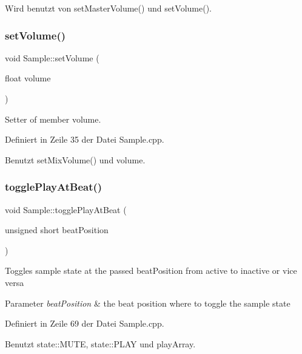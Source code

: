Wird benutzt von set\+Master\+Volume() und set\+Volume().

\mbox{\label{class_sample_ae298bfb5c8c1c3c867fa962e799a2fa5}} 
\subsubsection{\texorpdfstring{set\+Volume()}{setVolume()}}
{\footnotesize\ttfamily void Sample\+::set\+Volume (\begin{DoxyParamCaption}\item[{float}]{volume }\end{DoxyParamCaption})}



Setter of member volume. 



Definiert in Zeile 35 der Datei Sample.\+cpp.



Benutzt set\+Mix\+Volume() und volume.

\mbox{\label{class_sample_a4bf009853c35f7a29955fa2554d8e799}} 
\subsubsection{\texorpdfstring{toggle\+Play\+At\+Beat()}{togglePlayAtBeat()}}
{\footnotesize\ttfamily void Sample\+::toggle\+Play\+At\+Beat (\begin{DoxyParamCaption}\item[{unsigned short}]{beat\+Position }\end{DoxyParamCaption})}

Toggles sample state at the passed beat\+Position from active to inactive or vice versa 
\begin{DoxyParams}{Parameter}
{\em beat\+Position} & the beat position where to toggle the sample state \\
\hline
\end{DoxyParams}


Definiert in Zeile 69 der Datei Sample.\+cpp.



Benutzt state\+::\+M\+U\+TE, state\+::\+P\+L\+AY und play\+Array.



